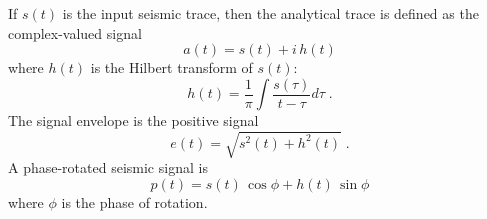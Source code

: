 If $s(t)$ is the input seismic trace, then the analytical trace is defined as the complex-valued signal 
\[
a(t) = s(t)+i\,h(t)
\]
where $h(t)$ is the Hilbert transform of $s(t)$:
\[
h(t) =\displaystyle \frac{1}{\pi} \int \frac{s(\tau)}{t-\tau} d\tau\;.
\]
The signal envelope is  the positive signal
\[
e(t)=\sqrt{s^2(t)+h^2(t)}\;.
\]
A phase-rotated seismic signal is 
\[
p(t)=s(t)\,\cos{\phi} +h(t)\,\sin{\phi}
\]
where $\phi$ is the phase of rotation.
